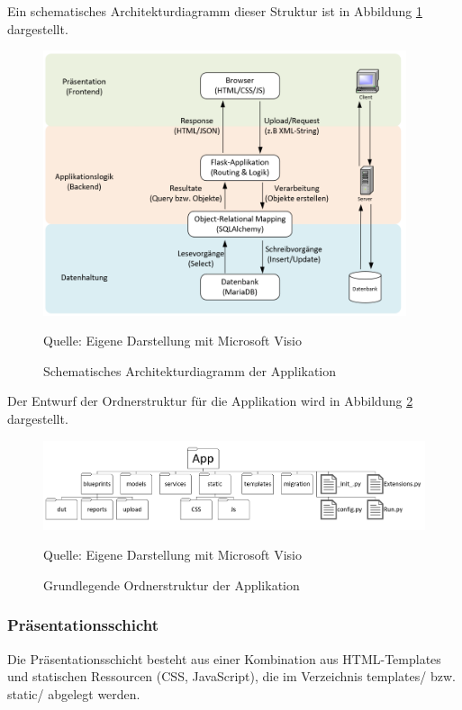 Ein schematisches Architekturdiagramm dieser Struktur ist in Abbildung \ref{fig:arch_minimal} dargestellt.

\begin{figure}[H]
    \centering
    \includegraphics[width=0.95\textwidth]{Grafiken/Architekturdiagramm}
    \caption{Schematisches Architekturdiagramm der Applikation}
    \label{fig:arch_minimal}
    {Quelle: Eigene Darstellung mit Microsoft Visio}
\end{figure}

Der Entwurf der Ordnerstruktur für die Applikation wird in Abbildung \ref{fig: Grundlegende Ordnerstruktur der Applikation} dargestellt.

\begin{figure}[H]
    \centering
    \includegraphics[width=1\textwidth]{Grafiken/Minimale Ordnerstruktur Projekt}
    \caption{Grundlegende Ordnerstruktur der Applikation}
    \label{fig: Grundlegende Ordnerstruktur der Applikation}
    {Quelle: Eigene Darstellung mit Microsoft Visio}
\end{figure}

\subsubsection{Präsentationsschicht}


Die Präsentationsschicht besteht aus einer Kombination aus HTML-Templates und statischen Ressourcen (CSS, JavaScript),
die im Verzeichnis templates/ bzw. static/ abgelegt werden.

